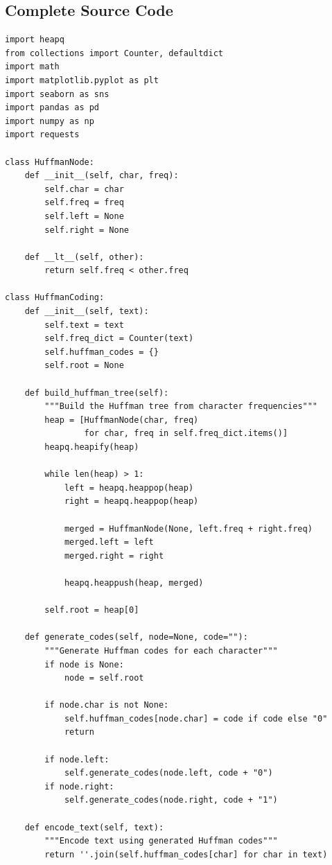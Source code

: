 \documentclass[11pt,a4paper]{article}
\begin{document}
\subsection{Complete Source Code}

\begin{lstlisting}
import heapq
from collections import Counter, defaultdict
import math
import matplotlib.pyplot as plt
import seaborn as sns
import pandas as pd
import numpy as np
import requests

class HuffmanNode:
    def __init__(self, char, freq):
        self.char = char
        self.freq = freq
        self.left = None
        self.right = None
    
    def __lt__(self, other):
        return self.freq < other.freq

class HuffmanCoding:
    def __init__(self, text):
        self.text = text
        self.freq_dict = Counter(text)
        self.huffman_codes = {}
        self.root = None
        
    def build_huffman_tree(self):
        """Build the Huffman tree from character frequencies"""
        heap = [HuffmanNode(char, freq) 
                for char, freq in self.freq_dict.items()]
        heapq.heapify(heap)
        
        while len(heap) > 1:
            left = heapq.heappop(heap)
            right = heapq.heappop(heap)
            
            merged = HuffmanNode(None, left.freq + right.freq)
            merged.left = left
            merged.right = right
            
            heapq.heappush(heap, merged)
        
        self.root = heap[0]
    
    def generate_codes(self, node=None, code=""):
        """Generate Huffman codes for each character"""
        if node is None:
            node = self.root
        
        if node.char is not None:
            self.huffman_codes[node.char] = code if code else "0"
            return
        
        if node.left:
            self.generate_codes(node.left, code + "0")
        if node.right:
            self.generate_codes(node.right, code + "1")
    
    def encode_text(self, text):
        """Encode text using generated Huffman codes"""
        return ''.join(self.huffman_codes[char] for char in text)
    

\end{lstlisting}
\end{document}
